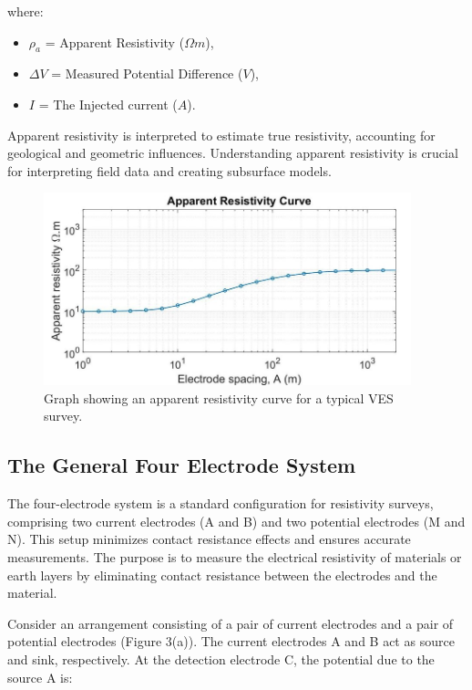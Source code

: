 \documentclass[12pt,a4paper]{report}
\begin{document}
where:
\begin{itemize}
    \item $\rho_a$ = Apparent Resistivity ($\Omega m$),
    \item $\Delta V$ = Measured Potential Difference ($V$),
    \item $I$ = The Injected current ($A$).
\end{itemize}

Apparent resistivity is interpreted to estimate true resistivity, accounting for geological and geometric influences. Understanding apparent resistivity is crucial for interpreting field data and creating subsurface models.

\begin{figure}[h]
    \centering
    \includegraphics[width=0.95\textwidth]{Apparent-resistivity-curve-for-a-two-layer-model.png}
    \caption{Graph showing an apparent resistivity curve for a typical VES survey.}
\end{figure}

\subsection{The General Four Electrode System}

The four-electrode system is a standard configuration for resistivity surveys, comprising two current electrodes (A and B) and two potential electrodes (M and N). This setup minimizes contact resistance effects and ensures accurate measurements. The purpose is to measure the electrical resistivity of materials or earth layers by eliminating contact resistance between the electrodes and the material.

Consider an arrangement consisting of a pair of current electrodes and a pair of potential electrodes (Figure 3(a)). The current electrodes A and B act as source and sink, respectively. At the detection electrode C, the potential due to the source A is:
\end{document}
